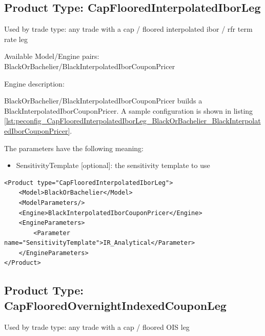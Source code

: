 \subsection{Product Type: CapFlooredInterpolatedIborLeg}

Used by trade type: any trade with a cap / floored interpolated ibor / rfr term rate leg

Available Model/Engine pairs: BlackOrBachelier/BlackInterpolatedIborCouponPricer

Engine description:

BlackOrBachelier/BlackInterpolatedIborCouponPricer builds a BlackInterpolatedIborCouponPricer. A sample configuration is
shown in listing \ref{lst:peconfig_CapFlooredInterpolatedIborLeg_BlackOrBachelier_BlackInterpolatedIborCouponPricer}.

The parameters have the following meaning:

\begin{itemize}
\item SensitivityTemplate [optional]: the sensitivity template to use
\end{itemize}

\begin{longlisting}
\begin{verbatim}
<Product type="CapFlooredInterpolatedIborLeg">
    <Model>BlackOrBachelier</Model>
    <ModelParameters/>
    <Engine>BlackInterpolatedIborCouponPricer</Engine>
    <EngineParameters>
        <Parameter name="SensitivityTemplate">IR_Analytical</Parameter>
    </EngineParameters>
</Product>
\end{verbatim}
\caption{Configuration for Product CapFlooredInterpolatedIborLeg, Model BlackOrBachelier, Engine BlackInterpolatedIborCouponPricer}
\label{lst:peconfig_CapFlooredInterpolatedIborLeg_BlackOrBachelier_BlackInterpolatedIborCouponPricer}
\end{longlisting}

\subsection{Product Type: CapFlooredOvernightIndexedCouponLeg}

Used by trade type: any trade with a cap / floored OIS leg

